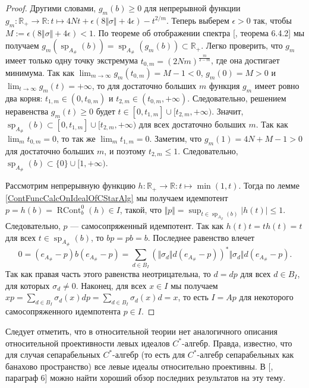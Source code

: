 \begin{proof}
Другими словами, $g_m(b)\geq 0$ для непрерывной функции $g_m:\mathbb{R}_+\to\mathbb{R}:t\mapsto 4Nt+\epsilon(8\Vert\sigma\Vert+4\epsilon)-t^{2/m}$. Теперь выберем $\epsilon>0$ так, чтобы $M:=\epsilon(8\Vert\sigma\Vert+4\epsilon)<1$. По теореме об отображении спектра [\cite{HelLectAndExOnFuncAn}, теорема 6.4.2] мы получаем $g_m(\operatorname{sp}_{A_\#}(b))=\operatorname{sp}_{A_\#}(g_m(b))\subset\mathbb{R}_+$. Легко проверить, что $g_m$ имеет только одну точку экстремума $t_{0,m}=(2Nm)^{\frac{m}{2-m}}$, где она достигает минимума. Так как $\lim_{m\to\infty} g_m(t_{0,m})=M-1<0$, $g_m(0)=M>0$ и $\lim_{t\to\infty} g_m(t)=+\infty$, то для достаточно больших $m$ функция $g_m$ имеет ровно два корня: $t_{1,m}\in(0,t_{0,m})$ и $t_{2,m}\in(t_{0,m},+\infty)$. Следовательно, решением неравенства $g_m(t)\geq 0$ будет $t\in[0,t_{1,m}]\cup[t_{2,m},+\infty)$. Значит, $\operatorname{sp}_{A_\#}(b)\subset[0,t_{1,m}]\cup[t_{2,m},+\infty)$ для всех достаточно больших $m$. Так как $\lim_m t_{0,m}=0$, то так же $\lim_m t_{1,m}=0$. Заметим, что $g_m(1)=4N+M-1>0$ для достаточно больших $m$, и поэтому $t_{2,m}\leq 1$. Следовательно, $\operatorname{sp}_{A_\#}(b)\subset\{0\}\cup[1,+\infty)$.

Рассмотрим непрерывную функцию $h:\mathbb{R}_+\to\mathbb{R}:t\mapsto\min(1, t)$. Тогда по лемме \ref{ContFuncCalcOnIdealOfCStarAlg} мы получаем идемпотент $p=h(b)=\operatorname{RCont}_b^0(h)\in I$, такой, что $\Vert p\Vert=\sup_{t\in\operatorname{sp}_{A_\#}(b)}|h(t)|\leq 1$. Следовательно, $p$ --- самосопряженный идемпотент. Так как $h(t)t=th(t)=t$ для всех $t\in \operatorname{sp}_{A_\#}(b)$, то $bp=pb=b$. Последнее равенство влечет
$$
0=(e_{A_\#}-p)b(e_{A_\#}-p)=\sum_{d\in B_I}(\Vert\sigma_d\Vert d(e_{A_\#}-p))^*\Vert\sigma_d\Vert d(e_{A_\#}-p).
$$
Так как правая часть этого равенства неотрицательна, то $d=dp$ для всех $d\in B_I$, для которых $\sigma_d\neq 0$. Наконец, для всех $x\in I$ мы получаем $xp=\sum_{d\in B_I}\sigma_d(x)dp=\sum_{d\in B_I}\sigma_d(x)d=x$, то есть $I=Ap$ для некоторого самосопряженного идемпотента $p\in I$.
\end{proof}

Следует отметить, что в относительной теории нет аналогичного описания относительной проективности левых идеалов $C^*$-алгебр. Правда, известно, что для случая сепарабельных $C^*$-алгебр (то есть для $C^*$-алгебр сепарабельных как банахово пространство) все левые идеалы относительно проективны. В [\cite{LykProjOfBanAndCStarAlgsOfContFld}, параграф 6] можно найти хороший обзор последних результатов на эту тему.

